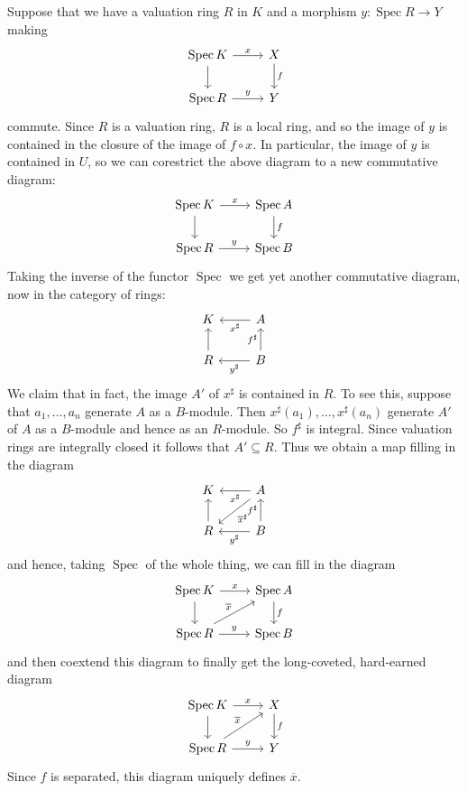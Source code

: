\documentclass[10pt]{article}
\newcommand{\Spec}{\operatorname{Spec}}
\theoremstyle{definition}
\begin{document}
Suppose that we have a valuation ring $R$ in $K$ and a morphism $y: \Spec R \to Y$ making
$$\begin{tikzcd}
\Spec K \arrow[r,"x"] \arrow[d] & X \arrow[d,"f"] \\
\Spec R \arrow[r,"y"] & Y
\end{tikzcd}$$
commute.
Since $R$ is a valuation ring, $R$ is a local ring, and so the image of $y$ is contained in the closure of the image of $f \circ x$.
In particular, the image of $y$ is contained in $U$, so we can corestrict the above diagram to a new commutative diagram:
$$\begin{tikzcd}
\Spec K \arrow[r,"x"] \arrow[d] & \Spec A \arrow[d,"f"] \\
\Spec R \arrow[r,"y"] & \Spec B
\end{tikzcd}$$
Taking the inverse of the functor $\Spec$ we get yet another commutative diagram, now in the category of rings:
$$\begin{tikzcd}
K & A \arrow[l,"x^\sharp"] \\
R \arrow[u] & B \arrow[l, "y^\sharp"] \arrow[u,"f^\sharp"]
\end{tikzcd}$$
We claim that in fact, the image $A'$ of $x^\sharp$ is contained in $R$.
To see this, suppose that $a_1, \dots, a_n$ generate $A$ as a $B$-module.
Then $x^\sharp(a_1), \dots, x^\sharp(a_n)$ generate $A'$ of $A$ as a $B$-module and hence as an $R$-module.
So $f^\sharp$ is integral.
Since valuation rings are integrally closed it follows that $A' \subseteq R$.
Thus we obtain a map filling in the diagram
$$\begin{tikzcd}
K & A \arrow[l,"x^\sharp"] \arrow[dl,"\overline x^\sharp"] \\
R \arrow[u] & B \arrow[l, "y^\sharp"] \arrow[u,"f^\sharp"]
\end{tikzcd}$$
and hence, taking $\Spec$ of the whole thing, we can fill in the diagram
$$\begin{tikzcd}
\Spec K \arrow[r,"x"] \arrow[d] & \Spec A \arrow[d,"f"] \\
\Spec R \arrow[r,"y"] \arrow[ur,"\overline x"] & \Spec B
\end{tikzcd}$$
and then coextend this diagram to finally get the long-coveted, hard-earned diagram
$$\begin{tikzcd}
\Spec K \arrow[r,"x"] \arrow[d] & X \arrow[d,"f"] \\
\Spec R \arrow[r,"y"] \arrow[ur,"\overline x"] & Y
\end{tikzcd}$$
Since $f$ is separated, this diagram uniquely defines $\overline x$.
\end{document}
